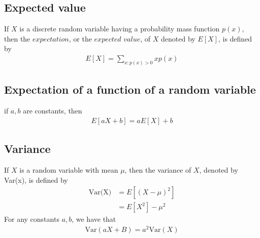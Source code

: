 \documentclass[a4paper]{article}
\begin{document}
\subsection{Expected value} %
\label{sub:Expected value}
If $X$ is a discrete random variable having a probability mass function $p(x)$, then the $expectation$, or the $expected$ $value$,
of $X$ denoted by $E[X]$, is defined by
\begin{align}
  E[X]= \sum_{x:p(x) > 0 } x p(x) 
\end{align}
\subsection{Expectation of a function of a random variable} %
\label{sub:Expectation of a function of a random variable}
if $a,b$ are constants, then
\begin{align}
  E[aX+b]=a E[X]+b 
\end{align}
\subsection{Variance} %
\label{sub:Variance}
If $X$ is a random variable with mean $\mu$, then the variance of $X$, denoted by Var(x), is defined by
\begin{align}
  \text{Var(X)} & = E[(X-\mu)^2]  \\
                & = E[X^2]-\mu^2
\end{align}
For any constants $a,b$, we have that
\begin{align}
  \text{Var}(aX+B)=a^2\text{Var}(X)
\end{align}
\end{document}
